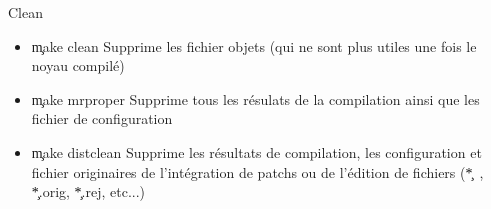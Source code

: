 \begin{frame}[fragile=singleslide]{Clean}
  \begin{itemize}
  \item \c{make clean}  Supprime les fichier objets (qui  ne sont plus
    utiles une fois le noyau compilé)
  \item \c{make mrproper} Supprime tous les résulats de la compilation
    ainsi que les fichier de configuration
  \item \c{make distclean} Supprime  les résultats de compilation, les
    configuration et fichier originaires de l'intégration de patchs ou
    de l'édition de fichiers (\c{*~}, \c{*.orig}, \c{*.rej}, etc...)
  \end{itemize} 
\end{frame} 

